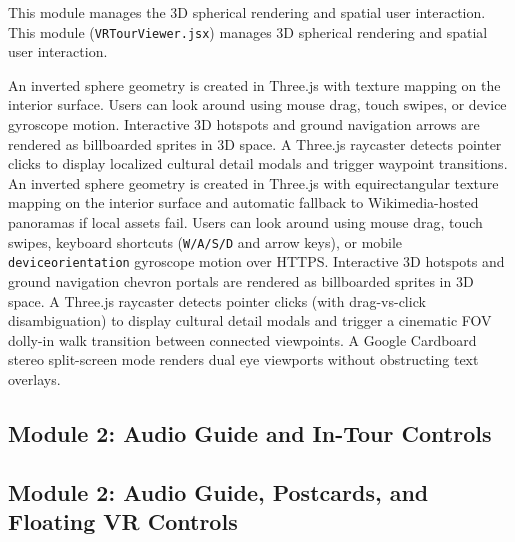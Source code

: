 \documentclass{tietreport}
\begin{document}
This module manages the 3D spherical rendering and spatial user interaction. 
This module (\texttt{VRTourViewer.jsx}) manages 3D spherical rendering and spatial user interaction.

An inverted sphere geometry is created in Three.js with texture mapping on the interior surface. Users can look around using mouse drag, touch swipes, or device gyroscope motion. Interactive 3D hotspots and ground navigation arrows are rendered as billboarded sprites in 3D space. A Three.js raycaster detects pointer clicks to display localized cultural detail modals and trigger waypoint transitions.
An inverted sphere geometry is created in Three.js with equirectangular texture mapping on the interior surface and automatic fallback to Wikimedia-hosted panoramas if local assets fail. Users can look around using mouse drag, touch swipes, keyboard shortcuts (\texttt{W/A/S/D} and arrow keys), or mobile \texttt{deviceorientation} gyroscope motion over HTTPS. Interactive 3D hotspots and ground navigation chevron portals are rendered as billboarded sprites in 3D space. A Three.js raycaster detects pointer clicks (with drag-vs-click disambiguation) to display cultural detail modals and trigger a cinematic FOV dolly-in walk transition between connected viewpoints. A Google Cardboard stereo split-screen mode renders dual eye viewports without obstructing text overlays.

\subsection{Module 2: Audio Guide and In-Tour Controls}
\subsection{Module 2: Audio Guide, Postcards, and Floating VR Controls}
\end{document}
